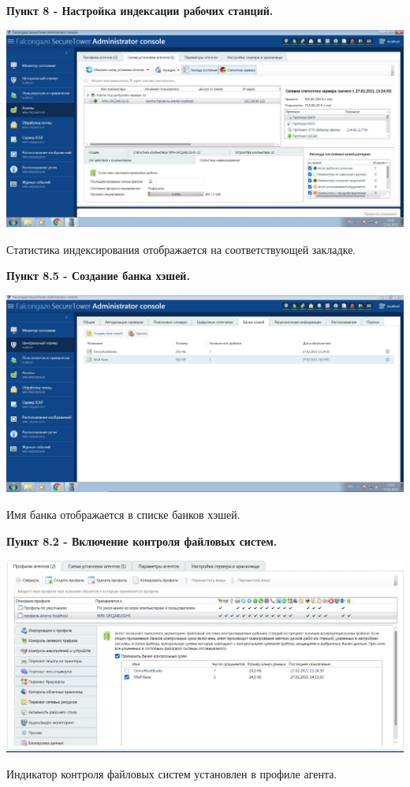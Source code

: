 \documentclass[a4paper,14pt]{extarticle}
\begin{document}
    \textbf{Пункт 8 - Настройка индексации рабочих станций.} 
    \begin{center}
        \includegraphics[scale=0.25]{pics/8.jpg}

        Статистика индексирования отображается на соответствующей закладке.
    \end{center}

    \textbf{Пункт 8.5 - Создание банка хэшей.} 
    \begin{center}
        \includegraphics[scale=0.25]{pics/8_1.jpg}

        Имя банка отображается в списке банков хэшей.
    \end{center}

    \newpage
    \textbf{Пункт 8.2 - Включение контроля файловых систем.} 
    \begin{center}
        \includegraphics[scale=0.25]{pics/8_2.jpg}

        Индикатор контроля файловых систем установлен в профиле агента.
    \end{center}
\end{document}
